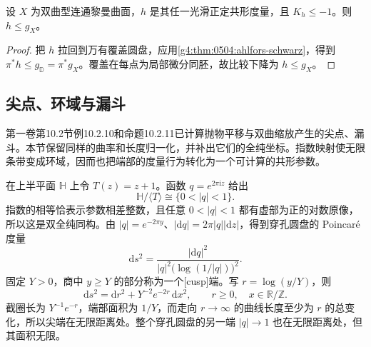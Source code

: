 \begin{proposition}
	\label{g4:prop:0504:poincare-maximal}
	设 \(X\) 为双曲型连通黎曼曲面，\(h\) 是其任一光滑正定共形度量，且 \(K_h\le-1\)。则 \(h\le g_X\)。
\end{proposition}
\begin{proof}
	把 \(h\) 拉回到万有覆盖圆盘，应用\cref{g4:thm:0504:ahlfors-schwarz}，得到 \(\pi^*h\le g_{\mathbb D}=\pi^*g_X\)。覆盖在每点为局部微分同胚，故比较下降为 \(h\le g_X\)。
\end{proof}

\subsection{尖点、环域与漏斗}
\label{g4:subsec:0504:04}

第一卷第10.2节例10.2.10和命题10.2.11已计算抛物平移与双曲缩放产生的尖点、漏斗。本节保留同样的曲率和长度归一化，并补出它们的全纯坐标。指数映射使无限条带变成环域，因而也把端部的度量行为转化为一个可计算的共形参数。

\begin{example}
	\label{g4:exm:0504:cusp}
	在上半平面 \(\mathbb H\) 上令 \(T(z)=z+1\)。函数 \(q=e^{2\pi\mathrm{i}z}\) 给出
	\[
		\mathbb H/\langle T\rangle\cong\{0<|q|<1\}.
	\]
	指数的相等恰表示参数相差整数，且任意 \(0<|q|<1\) 都有虚部为正的对数原像，所以这是双全纯同构。由 \(|q|=e^{-2\pi y}\)、\(|\mathrm{d}q|=2\pi|q||\mathrm{d}z|\)，得到穿孔圆盘的 Poincaré 度量
	\begin{equation}
		\label{g4:eq:0504:punctured-disk-metric}
		\mathrm{d}s^2=\frac{|\mathrm{d}q|^2}{|q|^2\bigl(\log(1/|q|)\bigr)^2}.
	\end{equation}
	固定 \(Y>0\)，商中 \(y\ge Y\) 的部分称为一个[cusp]端。写 \(r=\log(y/Y)\)，则
	\[
		\mathrm{d}s^2=\mathrm{d}r^2+Y^{-2}e^{-2r}\,\mathrm{d}x^2,
		\qquad r\ge0,\quad x\in\mathbb R/\mathbb Z.
	\]
	截圈长为 \(Y^{-1}e^{-r}\)，端部面积为 \(1/Y\)，而走向 \(r\to\infty\) 的曲线长度至少为 \(r\) 的总变化，所以尖端在无限距离处。整个穿孔圆盘的另一端 \(|q|\to1\) 也在无限距离处，但其面积无限。
\end{example}

